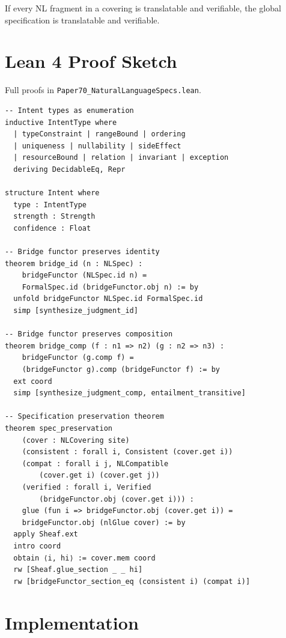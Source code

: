 \documentclass[11pt]{article}
\begin{document}
\begin{corollary}[Completeness]\label{cor:completeness}
If every NL fragment in a covering is translatable and verifiable,
the global specification is translatable and verifiable.
\end{corollary}

\section{Lean 4 Proof Sketch}\label{sec:lean-proof}

Full proofs in \texttt{Paper70\_NaturalLanguageSpecs.lean}.

\begin{lstlisting}[style=jugeo-output]
-- Intent types as enumeration
inductive IntentType where
  | typeConstraint | rangeBound | ordering
  | uniqueness | nullability | sideEffect
  | resourceBound | relation | invariant | exception
  deriving DecidableEq, Repr

structure Intent where
  type : IntentType
  strength : Strength
  confidence : Float

-- Bridge functor preserves identity
theorem bridge_id (n : NLSpec) :
    bridgeFunctor (NLSpec.id n) =
    FormalSpec.id (bridgeFunctor.obj n) := by
  unfold bridgeFunctor NLSpec.id FormalSpec.id
  simp [synthesize_judgment_id]

-- Bridge functor preserves composition
theorem bridge_comp (f : n1 => n2) (g : n2 => n3) :
    bridgeFunctor (g.comp f) =
    (bridgeFunctor g).comp (bridgeFunctor f) := by
  ext coord
  simp [synthesize_judgment_comp, entailment_transitive]

-- Specification preservation theorem
theorem spec_preservation
    (cover : NLCovering site)
    (consistent : forall i, Consistent (cover.get i))
    (compat : forall i j, NLCompatible
        (cover.get i) (cover.get j))
    (verified : forall i, Verified
        (bridgeFunctor.obj (cover.get i))) :
    glue (fun i => bridgeFunctor.obj (cover.get i)) =
    bridgeFunctor.obj (nlGlue cover) := by
  apply Sheaf.ext
  intro coord
  obtain ⟨i, hi⟩ := cover.mem coord
  rw [Sheaf.glue_section _ _ hi]
  rw [bridgeFunctor_section_eq (consistent i) (compat i)]
\end{lstlisting}

\section{Implementation}\label{sec:implementation}
\end{document}
